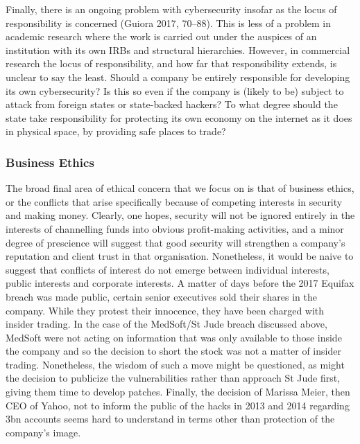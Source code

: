 \documentclass{svjour3}                     %
\begin{document}
Finally, there is an ongoing problem with cybersecurity insofar as the locus of responsibility is concerned (Guiora 2017, 70–88). This is less of a problem in academic research where the work is carried out under the auspices of an institution with its own IRBs and structural hierarchies. However, in commercial research the locus of responsibility, and how far that responsibility extends, is unclear to say the least. Should a company be entirely responsible for developing its own cybersecurity? Is this so even if the company is (likely to be) subject to attack from foreign states or state-backed hackers? To what degree should the state take responsibility for protecting its own economy on the internet as it does in physical space, by providing safe places to trade?

\subsubsection{Business Ethics}
The broad final area of ethical concern that we focus on is that of business ethics, or the conflicts that arise specifically because of competing interests in security and making money.  Clearly, one hopes, security will not be ignored entirely in the interests of channelling funds into obvious profit-making activities, and a minor degree of prescience will suggest that good security will strengthen a company’s reputation and client trust in that organisation.  Nonetheless, it would be naive to suggest that conflicts of interest do not emerge between individual interests, public interests and corporate interests. A matter of days before the 2017 Equifax breach was made public, certain senior executives sold their shares in the company. While they protest their innocence, they have been charged with insider trading. In the case of the MedSoft/St Jude breach discussed above, MedSoft were not acting on information that was only available to those inside the company and so the decision to short the stock was not a matter of insider trading. Nonetheless, the wisdom of such a move might be questioned, as might the decision to publicize the vulnerabilities rather than approach St Jude first, giving them time to develop patches. Finally, the decision of Marissa Meier, then CEO of Yahoo, not to inform the public of the hacks in 2013 and 2014 regarding 3bn accounts seems hard to understand in terms other than protection of the company’s image.
\end{document}
